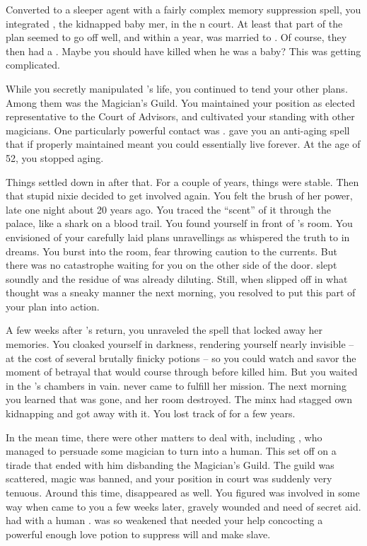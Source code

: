 \documentclass[char]{NeptuneBall}
\begin{document}
Converted to a sleeper agent with a fairly complex memory suppression spell, you integrated \cQueen{}, the kidnapped baby mer\cQueen{\kid}, in the \pAtlantis{}n court. At least that part of the plan seemed to go off well, and within a year, \cKing{} was married to \cQueen{}. Of course, they then had a \cAriel{\offspring}. Maybe you should have killed \cKing{} when he was a baby? This was getting complicated.

While you secretly manipulated \cKing{\King} \cKing{}'s life, you continued to tend your other plans. Among them was the Magician's Guild. You maintained your position as elected representative to the Court of Advisors, and cultivated your standing with other magicians. One particularly powerful contact was \cWitch{}. \cWitch{\They} gave you an anti-aging spell that if properly maintained meant you could essentially live forever. At the age of 52, you stopped aging.

Things settled down in \pAtlantis{} after that. For a couple of years, things were stable. Then that stupid nixie decided to get involved again. You felt the brush of her power, late one night about 20 years ago. You traced the ``scent'' of it through the palace, like a shark on a blood trail. You found yourself in front of \cQueen{}'s room. You envisioned of your carefully laid plans unravellings as \cNixie{} whispered the truth to \cQueen{} in dreams. You burst into the room, fear throwing caution to the currents. But there was no catastrophe waiting for you on the other side of the door. \cQueen{} slept soundly and the residue of \cNixie{} was already diluting. Still, when \cQueen{} slipped off in what \cQueen{\they} thought was a sneaky manner the next morning, you resolved to put this part of your plan into action.

A few weeks after \cQueen{}'s return, you unraveled the spell that locked away her memories. You cloaked yourself in darkness, rendering yourself nearly invisible -- at the cost of several brutally finicky potions -- so you could watch and savor the moment of betrayal that would course through \cKing{} before \cQueen{} killed him. But you waited in the \cKing{\King}'s chambers in vain. \cQueen{} never came to fulfill her mission. The next morning you learned that \cQueen{\they} was gone, and her room destroyed. The minx had stagged \cQueen{\them} own kidnapping and got away with it. You lost track of \cQueen{\them} for a few years.

In the mean time, there were other matters to deal with, including \cAriel{\Prince} \cAriel{}, who managed to persuade some magician to turn \cAriel{\them} into a human. This set \cKing{} off on a tirade that ended with him disbanding the Magician's Guild. The guild was scattered, magic was banned, and your position in court was suddenly very tenuous. Around this time, \cWitch{} disappeared as well. You figured \cWitch{\they} was involved in some way when \cWitch{\they} came to you a few weeks later, gravely wounded and need of secret aid. \cWitch{\They} had with \cWitch{\them} a human \cSlave{\Prince}. \cWitch{} was so weakened that \cWitch{\they} needed your help concocting a powerful enough love potion to suppress \cSlave{\their} will and make \cSlave{\them} \cWitch{\them} slave. 
\end{document}
